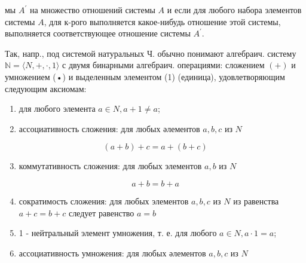 \documentclass[10pt]{article}
\begin{document}
мы $A^{\prime}$ на множество отношений системы $A$ и если для любого набора элементов системы $A$, для к-рого выполняется какое-нибудь отношение этой системы, выполняется соответствующее отношение системы $A^{\prime}$.



Так, напр., под системой натуральных Ч. обычно понимают алгебраич. систему $\mathbb{N}=\langle N,+, \cdot, 1\rangle$ с двумя бинарными алгебраич. операциями: сложением $(+)$ и умножением (•) и выделенным элементом (1) (единица), удовлетворяющим следующим аксиомам:



\begin{enumerate}

  \item для любого элемента $a \in N, a+1 \neq a$;



  \item ассоциативность сложения: для любых әлементов $a, b, c$ из $N$



\end{enumerate}



\[

(a+b)+c=a+(b+c)

\]



\begin{enumerate}

  \setcounter{enumi}{2}

  \item коммутативность сложения: для любых элементов $a, b$ из $N$

\end{enumerate}



\[

a+b=b+a

\]



\begin{enumerate}

  \setcounter{enumi}{3}

  \item сократимость сложения: для любых элементов $a, b, c$ из $N$ из равенства $a+c=b+c$ следует равенство $a=b$



  \item 1 - нейтральный элемент умножения, т. е. для любого $a \in N, a \cdot 1=a$;



  \item ассоциативность умножения: для любых әлементов $a, b, c$ из $N$



\end{enumerate}
\end{document}
